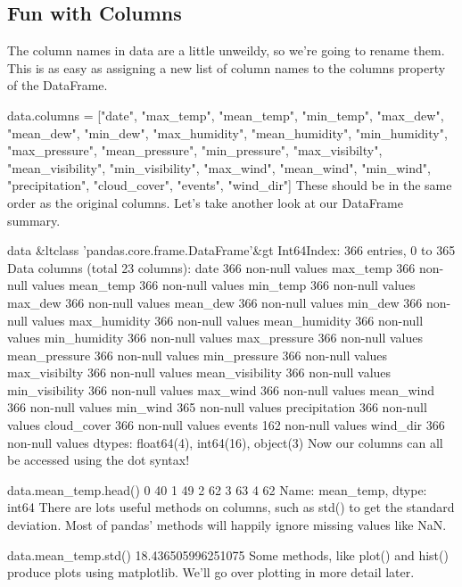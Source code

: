 \subsection{Fun with Columns}
The column names in data are a little unweildy, so we're going to rename them. This is as easy as assigning a new list of column names to the columns property of the DataFrame.

data.columns = ["date", "max_temp", "mean_temp", "min_temp", "max_dew",
                "mean_dew", "min_dew", "max_humidity", "mean_humidity",
                "min_humidity", "max_pressure", "mean_pressure",
                "min_pressure", "max_visibilty", "mean_visibility",
                "min_visibility", "max_wind", "mean_wind", "min_wind",
                "precipitation", "cloud_cover", "events", "wind_dir"]
These should be in the same order as the original columns. Let's take another look at our DataFrame summary.

data
&ltclass 'pandas.core.frame.DataFrame'&gt
Int64Index: 366 entries, 0 to 365
Data columns (total 23 columns):
date               366  non-null values
max_temp           366  non-null values
mean_temp          366  non-null values
min_temp           366  non-null values
max_dew            366  non-null values
mean_dew           366  non-null values
min_dew            366  non-null values
max_humidity       366  non-null values
mean_humidity      366  non-null values
min_humidity       366  non-null values
max_pressure       366  non-null values
mean_pressure      366  non-null values
min_pressure       366  non-null values
max_visibilty      366  non-null values
mean_visibility    366  non-null values
min_visibility     366  non-null values
max_wind           366  non-null values
mean_wind          366  non-null values
min_wind           365  non-null values
precipitation      366  non-null values
cloud_cover        366  non-null values
events             162  non-null values
wind_dir           366  non-null values
dtypes: float64(4), int64(16), object(3)
Now our columns can all be accessed using the dot syntax!

data.mean_temp.head()
0    40
1    49
2    62
3    63
4    62
Name: mean_temp, dtype: int64
There are lots useful methods on columns, such as std() to get the standard deviation. Most of pandas' methods will happily ignore missing values like NaN.

data.mean_temp.std()
18.436505996251075
Some methods, like plot() and hist() produce plots using matplotlib. We'll go over plotting in more detail later.

